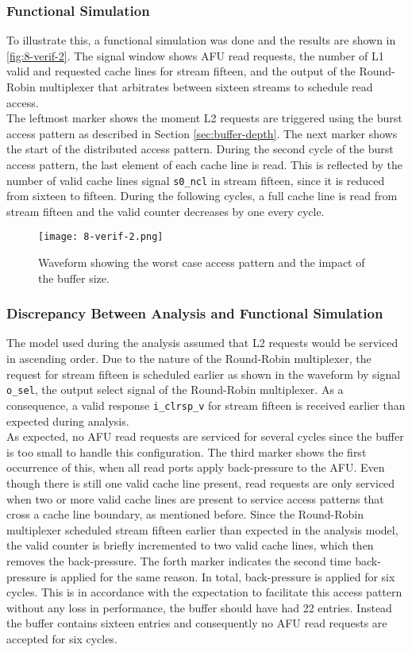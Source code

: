 \subsubsection{Functional Simulation}
To illustrate this, a functional simulation was done and the results are shown in \autoref{fig:8-verif-2}. The signal window shows AFU read requests, the number of L1 valid and requested cache lines for stream fifteen, and the output of the Round-Robin multiplexer that arbitrates between sixteen streams to schedule read access.\\
The leftmost marker shows the moment L2 requests are triggered using the burst access pattern as described in Section \ref{sec:buffer-depth}. The next marker shows the start of the distributed access pattern. During the second cycle of the burst access pattern, the last element of each cache line is read. This is reflected by the number of valid cache lines signal \texttt{s0\_ncl} in stream fifteen, since it is reduced from sixteen to fifteen. During the following cycles, a full cache line is read from stream fifteen and the valid counter decreases by one every cycle.

\begin{figure}[H]
  \centering
  \texttt{[image: 8-verif-2.png]}
  \caption{Waveform showing the worst case access pattern and the impact of the buffer size.}
  \label{fig:8-verif-2}
\end{figure}

\subsubsection{Discrepancy Between Analysis and Functional Simulation}
The model used during the analysis assumed that L2 requests would be serviced in ascending order. Due to the nature of the Round-Robin multiplexer, the request for stream fifteen is scheduled earlier as shown in the waveform by signal \texttt{o\_sel}, the output select signal of the Round-Robin multiplexer. As a consequence, a valid response \texttt{i\_clrsp\_v} for stream fifteen is received earlier than expected during analysis.\\
As expected, no AFU read requests are serviced for several cycles since the buffer is too small to handle this configuration. The third marker shows the first occurrence of this, when all read ports apply back-pressure to the AFU. Even though there is still one valid cache line present, read requests are only serviced when two or more valid cache lines are present to service access patterns that cross a cache line boundary, as mentioned before. Since the Round-Robin multiplexer scheduled stream fifteen earlier than expected in the analysis model, the valid counter is briefly incremented to two valid cache lines, which then removes the back-pressure. The forth marker indicates the second time back-pressure is applied for the same reason. In total, back-pressure is applied for six cycles. This is in accordance with the expectation to facilitate this access pattern without any loss in performance, the buffer should have had 22 entries. Instead the buffer contains sixteen entries and consequently no AFU read requests are accepted for six cycles.



